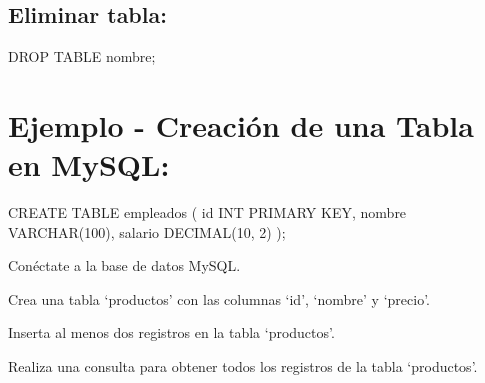 \documentclass[
  a4paper,
  DIV=11,
  numbers=noendperiod,
  onepage,
  openany]{scrreprt}
\newenvironment{Shaded}{\begin{snugshade}}{\end{snugshade}}
\newcommand{\DataTypeTok}[1]{\textcolor[rgb]{0.68,0.00,0.00}{#1}}
\newcommand{\DecValTok}[1]{\textcolor[rgb]{0.68,0.00,0.00}{#1}}
\newcommand{\KeywordTok}[1]{\textcolor[rgb]{0.00,0.23,0.31}{#1}}
\newcommand{\NormalTok}[1]{\textcolor[rgb]{0.00,0.23,0.31}{#1}}
\begin{document}
\hypertarget{eliminar-tabla-1}{%
\subsection{Eliminar tabla:}\label{eliminar-tabla-1}}

\begin{Shaded}
\begin{Highlighting}[]
\KeywordTok{DROP} \KeywordTok{TABLE}\NormalTok{ nombre;}
\end{Highlighting}
\end{Shaded}

\hypertarget{ejemplo---creaciuxf3n-de-una-tabla-en-mysql-1}{%
\section{Ejemplo - Creación de una Tabla en
MySQL:}\label{ejemplo---creaciuxf3n-de-una-tabla-en-mysql-1}}

\begin{Shaded}
\begin{Highlighting}[]
\KeywordTok{CREATE} \KeywordTok{TABLE}\NormalTok{ empleados (}
    \KeywordTok{id} \DataTypeTok{INT} \KeywordTok{PRIMARY} \KeywordTok{KEY}\NormalTok{,}
\NormalTok{    nombre }\DataTypeTok{VARCHAR}\NormalTok{(}\DecValTok{100}\NormalTok{),}
\NormalTok{    salario }\DataTypeTok{DECIMAL}\NormalTok{(}\DecValTok{10}\NormalTok{, }\DecValTok{2}\NormalTok{)}
\NormalTok{);}
\end{Highlighting}
\end{Shaded}

\begin{tcolorbox}[enhanced jigsaw, colbacktitle=quarto-callout-important-color!10!white, toprule=.15mm, leftrule=.75mm, titlerule=0mm, opacityback=0, rightrule=.15mm, opacitybacktitle=0.6, breakable, left=2mm, coltitle=black, title=\textcolor{quarto-callout-important-color}{\faExclamation}\hspace{0.5em}{Actividad Práctica:}, toptitle=1mm, bottomtitle=1mm, arc=.35mm, bottomrule=.15mm, colback=white, colframe=quarto-callout-important-color-frame]

Conéctate a la base de datos MySQL.

Crea una tabla `productos' con las columnas `id', `nombre' y `precio'.

Inserta al menos dos registros en la tabla `productos'.

Realiza una consulta para obtener todos los registros de la tabla
`productos'.

\end{tcolorbox}
\end{document}
